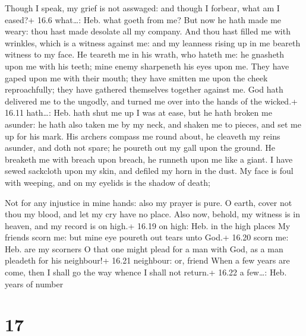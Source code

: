  Though I speak, my grief is not asswaged: and though I
forbear, what am I eased?+ 16.6 what\ldots: Heb. what goeth from me?
 But now he hath made me weary: thou hast made desolate all
my company.  And thou hast filled me with wrinkles, which is
a witness against me: and my leanness rising up in me beareth witness to
my face.  He teareth me in his wrath, who hateth me: he
gnasheth upon me with his teeth; mine enemy sharpeneth his eyes upon me.
 They have gaped upon me with their mouth; they have
smitten me upon the cheek reproachfully; they have gathered themselves
together against me.  God hath delivered me to the ungodly,
and turned me over into the hands of the wicked.+ 16.11 hath\ldots: Heb.
hath shut me up  I was at ease, but he hath broken me
asunder: he hath also taken me by my neck, and shaken me to pieces, and
set me up for his mark.  His archers compass me round
about, he cleaveth my reins asunder, and doth not spare; he poureth out
my gall upon the ground.  He breaketh me with breach upon
breach, he runneth upon me like a giant.  I have sewed
sackcloth upon my skin, and defiled my horn in the dust. 
My face is foul with weeping, and on my eyelids is the shadow of death;

 Not for any injustice in mine hands: also my prayer is
pure.  O earth, cover not thou my blood, and let my cry
have no place.  Also now, behold, my witness is in heaven,
and my record is on high.+ 16.19 on high: Heb. in the high places
 My friends scorn me: but mine eye poureth out tears unto
God.+ 16.20 scorn me: Heb. are my scorners  O that one
might plead for a man with God, as a man pleadeth for his neighbour!+
16.21 neighbour: or, friend  When a few years are come,
then I shall go the way whence I shall not return.+ 16.22 a few\ldots:
Heb. years of number

\hypertarget{section-16}{%
\section{17}\label{section-16}}


